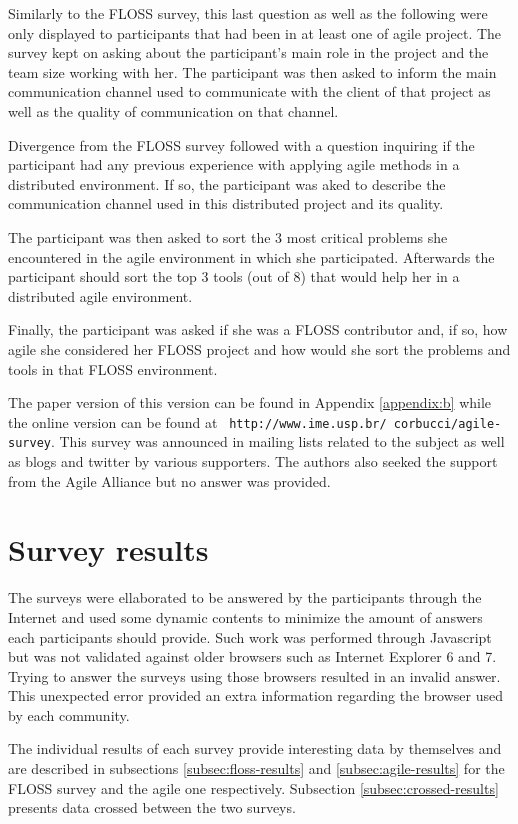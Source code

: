 \documentclass[lnbip]{svmultln}
\begin{document}
Similarly to the FLOSS survey, this last question as well as the
following were only displayed to participants that had been in at
least one of agile project. The survey kept on asking about the
participant's main role in the project and the team size working with
her. The participant was then asked to inform the main communication
channel used to communicate with the client of that project as well as
the quality of communication on that channel.

Divergence from the FLOSS survey followed with a question inquiring if
the participant had any previous experience with applying agile
methods in a distributed environment. If so, the participant was aked
to describe the communication channel used in this distributed project
and its quality.

The participant was then asked to sort the 3 most critical problems
she encountered in the agile environment in which she
participated. Afterwards the participant should sort the top 3 tools
(out of 8) that would help her in a distributed agile environment.

Finally, the participant was asked if she was a FLOSS contributor and,
if so, how agile she considered her FLOSS project and how would she
sort the problems and tools in that FLOSS environment.

The paper version of this version can be found in Appendix \ref{appendix:b}
while the online version can be found at {\tt
  http://www.ime.usp.br/~corbucci/agile-survey}. This survey was
announced in mailing lists related to the subject as well as blogs and
twitter by various supporters. The authors also seeked the support
from the Agile Alliance but no answer was provided.

\section{Survey results}
\label{sec:results}

The surveys were ellaborated to be answered by the participants
through the Internet and used some dynamic contents to minimize the
amount of answers each participants should provide. Such work was
performed through Javascript but was not validated against older
browsers such as Internet Explorer 6 and 7. Trying to answer the
surveys using those browsers resulted in an invalid answer. This
unexpected error provided an extra information regarding the browser
used by each community.

The individual results of each survey provide interesting data by
themselves and are described in subsections \ref{subsec:floss-results}
and \ref{subsec:agile-results} for the FLOSS survey and the agile one
respectively. Subsection \ref{subsec:crossed-results} presents data crossed
between the two surveys.
\end{document}
